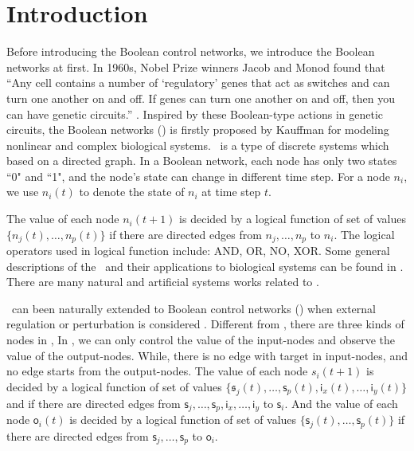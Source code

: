 \section{Introduction}
\label{sec:intro}


Before introducing the Boolean control networks, we introduce the Boolean networks at first. In 1960s, Nobel Prize winners Jacob and Monod found that ``Any cell contains a number of `regulatory' genes that act as switches and can turn one another on and off. If genes can turn one another on and off, then you can have genetic circuits.'' \cite{Jacob1961Genetic}. Inspired by these Boolean-type actions in genetic circuits, the Boolean networks (\BNs) is firstly proposed by Kauffman \cite{Kauffman1968Metabolic} for modeling nonlinear and complex biological systems. \BNs\ is a type of discrete systems which based on a directed graph. In a Boolean network, each node has only two states ``0" and ``1", and
the node's state     can change in different  time step.  For a node $n_i$, we use $n_i(t)$ to denote the state of $n_i$ at time step $t$.

The value of each node $n_i(t+1)$ is decided by a logical function of  set of  values  $\{n_j(t),\ldots,n_p(t)\}$ if  there are directed edges from $n_j,\ldots,n_p$ to $n_i$.%
The logical operators used in  logical function include: AND, OR, NO, XOR. Some general descriptions of the \BNs\ and their applications to biological systems can be found in \cite{Kauffman1968Metabolic}.
There are many natural and artificial systems works \cite{Akutsu2000Inferring, Shmulevich2002From, Faur2006Dynamical,Green2007The,Lou2010Multi} related to \BNs.
 

         \BNs\ can been naturally extended to Boolean control networks (\BCNs) when external regulation or perturbation is considered \cite{Ideker2001A}. Different from \BNs, there are three kinds of nodes in \BCNs,  In \BCNs, we can only control the value of the input-nodes and observe the value of the output-nodes. While, there is no edge with target in input-nodes, and no edge starts from the output-nodes. The value of each node $s_i(t+1)$ is decided by a logical function of set of  values  $\{\mathfrak{s}_j(t),\ldots,\mathsf{s}_p(t),\mathsf{i}_x(t),\ldots,\mathsf{i}_y(t)\}$ and if there are directed edges from $\mathsf{s}_j,\ldots,\mathsf{s}_p,\mathsf{i}_x,\ldots,\mathsf{i}_y$ to $\mathsf{s}_i$. And the value of each node $\mathsf{o}_i(t)$ is decided by a logical function of  set of  values  $\{\mathsf{s}_j(t),\ldots,\mathsf{s}_p(t)\}$ if  there are directed edges from $\mathsf{s}_j,\ldots,\mathsf{s}_p$ to $\mathsf{o}_i$.

